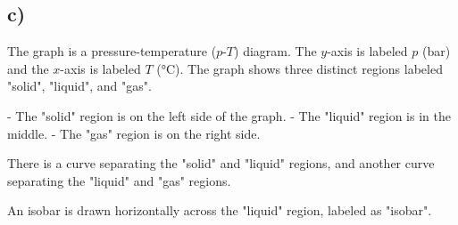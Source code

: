 

\subsection*{c)}

The graph is a pressure-temperature ($p$-$T$) diagram. The $y$-axis is labeled $p$ (bar) and the $x$-axis is labeled $T$ (°C). The graph shows three distinct regions labeled "solid", "liquid", and "gas". 

- The "solid" region is on the left side of the graph.
- The "liquid" region is in the middle.
- The "gas" region is on the right side.

There is a curve separating the "solid" and "liquid" regions, and another curve separating the "liquid" and "gas" regions. 

An isobar is drawn horizontally across the "liquid" region, labeled as "isobar".
